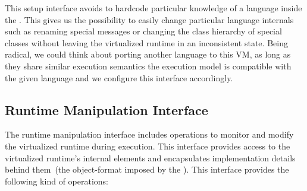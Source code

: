 This \VM setup interface avoids to hardcode particular knowledge of a language inside the \VM. This gives us the possibility to easily change particular language internals such as renaming special messages or changing the class hierarchy of special classes without leaving the virtualized runtime in an inconsistent state. Being radical, we could think about porting another language to this VM, as long as they share similar execution semantics \ie the \VM execution model is compatible with the given language and we configure this interface accordingly.



\subsection{Runtime Manipulation Interface} 
The runtime manipulation interface includes operations to monitor and modify the virtualized runtime during execution. This interface provides access to the virtualized runtime's internal elements and encapsulates implementation details behind them~(\ie the object-format imposed by the \VM). This interface provides the following kind of operations:

